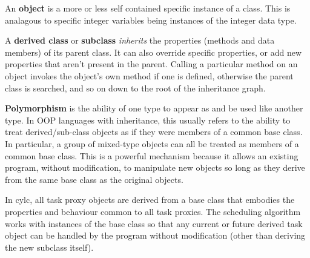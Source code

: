 \documentclass[11pt,a4paper]{article}
\begin{document}

An {\bf object} is a more or less self contained specific instance
of a class. This is analagous to specific integer variables being 
instances of the integer data type.

A {\bf derived class} or {\bf subclass} {\em inherits} the properties
(methods and data members) of its parent class. It can also override
specific properties, or add new properties that aren't present in the
parent. Calling a particular method on an object invokes the object's
own method if one is defined, otherwise the parent class is searched,
and so on down to the root of the inheritance graph. 



{\bf Polymorphism} is the ability of one type to appear as and be used
like another type.  In OOP languages with inheritance, this usually
refers to the ability to treat derived/sub-class objects as if they were
members of a common base class. In particular, a group of mixed-type
objects can all be treated as members of a common base class. 
This is a powerful mechanism because it allows an existing program,
without modification, to manipulate new objects so long as they 
derive from the same base class as the original objects.

In cylc, all task proxy objects are derived from a base class that 
embodies the properties and behaviour common to all task proxies. 
The scheduling algorithm works with instances of the base class so that
any current or future derived task object can be handled by the program
without modification (other than deriving the new subclass itself).
\end{document}
